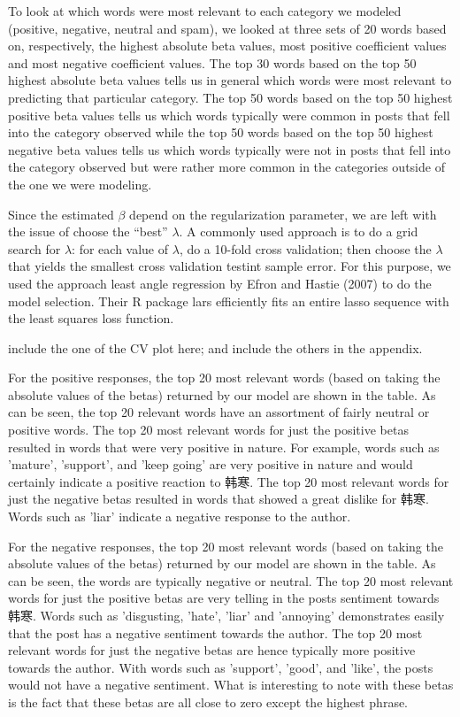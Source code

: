 \documentclass[11pt]{article}
\newcommand{\1}[1]{{\mathbf 1}\left\{#1\right\}}        %
\begin{document}
To look at which words were most relevant to each category we modeled (positive, negative, neutral and spam), we looked at three sets of 20 words based on, respectively, the highest absolute beta values, most positive coefficient values and most negative coefficient values. The top 30 words based on the top 50 highest absolute beta values tells us in general which words were most relevant to predicting that particular category.  The top 50 words based on the top 50 highest positive beta values tells us which words typically were common in posts that fell into the category observed while the top 50 words based on the top 50 highest negative beta values tells us which words typically were not in posts that fell into the category observed but were rather more common in the categories outside of the one we were modeling.

Since the estimated $\beta$ depend on the regularization parameter, we are left with the issue of choose the ``best'' $\lambda$. A commonly used approach is to do a grid search for $\lambda$: for each value of $\lambda$, do a 10-fold cross validation; then choose the $\lambda$ that yields the smallest cross validation testint sample error. For this purpose, we used the approach least angle regression by Efron and Hastie (2007) to do the model selection. Their R package lars efficiently fits an entire lasso sequence with the least squares loss function. 

include the one of the CV plot here; and include the others in the appendix.

For the positive responses, the top 20 most relevant words (based on taking the absolute values of the betas) returned by our model are shown in the table. As can be seen, the top 20 relevant words have an assortment of fairly neutral or positive words. The top 20 most relevant words for just the positive betas resulted in words that were very positive in nature. For example, words such as 'mature', 'support', and 'keep going' are very positive in nature and would certainly indicate a positive reaction to 韩寒. The top 20 most relevant words for just the negative betas resulted in words that showed a great dislike for 韩寒.  Words such as 'liar' indicate a negative response to the author. 

For the negative responses, the top 20 most relevant words (based on taking the absolute values of the betas) returned by our model are shown in the table. As can be seen, the words are typically negative or neutral.  The top 20 most relevant words for just the positive betas are very telling in the posts sentiment towards 韩寒. Words such as 'disgusting, 'hate', 'liar' and 'annoying' demonstrates easily that the post has a negative sentiment towards the author. The top 20 most relevant words for just the negative betas are hence typically more positive towards the author. With words such as 'support', 'good', and 'like', the posts would not have a negative sentiment. What is interesting to note with these betas is the fact that these betas are all close to zero except the highest phrase. 
\end{document}
